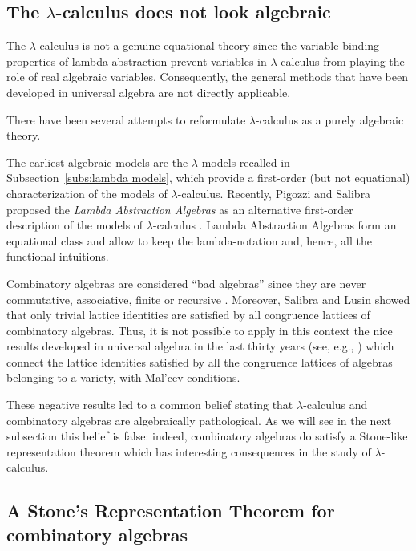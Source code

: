 \documentclass[english]{llncs}
\begin{document}
\subsection{The $\lambda$-calculus does not look algebraic}

The $\lambda$-calculus is not a genuine equational theory since the variable-binding properties of lambda abstraction prevent 
variables in $\lambda$-calculus from playing the role of real algebraic variables.
Consequently, the general methods that have been de\-ve\-lo\-ped in universal algebra are not directly applicable.

There have been several attempts to reformulate $\lambda$-calculus as a purely algebraic theory.

The earliest algebraic models are the $\lambda$-models recalled in Subsection~\ref{subs:lambda models},
which provide a first-order (but not equational) characterization of the models of $\lambda$-calculus.
Recently, Pigozzi and Salibra proposed the \emph{Lambda Abstraction Algebras} as an alternative first-order 
description of the models of $\lambda$-calculus \cite{PigozziS98,Salibra00}.
Lambda Abstraction Algebras form an equational class and allow to keep the lambda-notation and, hence, all the functional intuitions. 

Combinatory algebras are considered ``bad algebras'' since they are never commutative, associative, finite or recursive \cite[Prop.~5.1.15]{Bare}.
Moreover, Salibra and Lusin \cite{LusinS04} showed that only trivial lattice identities are satisfied by all congruence lattices of combinatory algebras. 
Thus, it is not possible to apply in this context the nice results developed in universal algebra in the last thirty years 
(see, e.g., \cite{BurrisS81,McKenzieMT87}) which connect the lattice identities satisfied by all the congruence lattices of algebras belonging 
to a variety, with Mal'cev conditions.

These negative results led to a common belief stating that $\lambda$-calculus and combinatory algebras are algebraically pathological.
As we will see in the next subsection this belief is false: indeed, combinatory algebras do satisfy a Stone-like representation theorem 
which has interesting consequences in the study of $\lambda$-calculus.

\subsection{A Stone's Representation Theorem for combinatory algebras}
\end{document}
